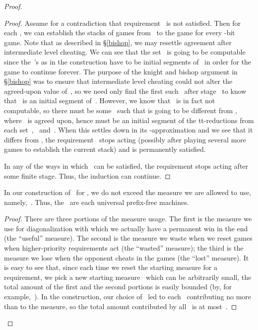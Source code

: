 \documentclass{LMCS}
\newcommand{\0}{\mathbf{0}}
\newcommand{\<}{\langle}
\renewcommand{\>}{\rangle}
\begin{document}
\begin{proof}
\begin{proof}
Assume for a contradiction that requirement~ is not satisfied.
Then for each , we can establish the stacks of games
from~ to the  game for every -bit game.  Note that as
described in \S\ref{bishop}, we may resettle agreement after intermediate
level cheating.  We can see that the set~ is going to be computable since
the~'s as in the construction have to be initial segments of~ in
order for the game to continue forever.  The purpose of the knight and bishop
argument in \S\ref{bishop} was to ensure that intermediate level cheating
could not alter the agreed-upon value of~, so we need only find the
first such~ after stage~ to know that~ is an initial
segment of~.  However, we know that~ is in fact not computable, so
there must be some~ such that  is going to be different from
, where~ is agreed upon, hence must be an initial segment
of the tt-reductions from each set~,~ and~.  When this 
settles down in its -approximation and we see that it differs
from , the requirement~ stops acting (possibly
after playing several more games to establish the current stack) and is
permanently satisfied.

In any of the ways in which~ can be satisfied, the requirement
stops acting after some finite stage. Thus, the induction can continue.
\end{proof}

\begin{lem}
In our construction of~ for , we do not exceed the measure we
are allowed to use, namely,~.  Thus, the~ are each universal
prefix-free machines.
\end{lem}

\begin{proof}
There are three portions of the measure usage. The first is the measure we
use for diagonalization with which we actually have a permanent win in the
end (the ``useful'' measure). The second is the measure we waste when we
reset games when higher-priority requirements act (the ``wasted'' measure);
the third is the measure we lose when the opponent cheats in the games (the
``lost'' measure). It is easy to see that, since each time we reset the
starting measure for a requirement, we pick a new starting
measure~ which can be arbitrarily small, the total amount of the
first and the second portions is easily bounded (by, for example,~). In
the construction, our choice of~ led to each~ contributing no
more than  to the measure, so the total amount contributed by
all~ is at most~.


\end{proof}
\end{proof}
\end{document}
